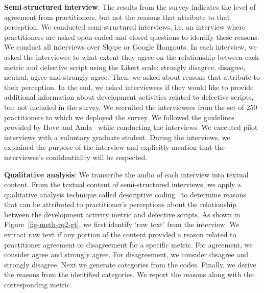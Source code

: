 \documentclass[smallextended]{svjour3}       %
\begin{document}
\textbf{Semi-structured interview}: The results from the survey indicates the level of agreement from practitioners, but not the reasons that attribute to that perception. We conducted semi-structured interviews, i.e. an interview where practitioners are asked open-ended and closed questions to identify these reasons. We conduct all interviews over Skype or Google Hangouts. In each interview, we asked the interviewee to what extent they agree on the relationship between each metric and defective script using the Likert scale: strongly disagree, disagree, neutral, agree and strongly agree. Then, we asked about reasons that attribute to their perception. In the end, we asked interviewees if they would like to provide additional information about development activities related to defective scripts, but not included in the survey. We recruited the interviewees from the set of 250 practitioners to which we deployed the survey. We followed the guidelines provided by Hove and Anda~\citep{hove:anda:semi:interview} while conducting the interviews. We executed pilot interviews with a voluntary graduate student. During the interviews, we explained the purpose of the interview and explicitly mention that the interviewee's confidentiality will be respected.  


\textbf{Qualitative analysis}: We transcribe the audio of each interview into textual content. From the textual content of semi-structured interviews, we apply a qualitative analysis technique called descriptive coding~\citep{saldana2015coding} to determine reasons that can be attributed to practitioner's perceptions about the relationship between the development activity metric and defective scripts. As shown in Figure~\ref{fig-meth-rq2-gt}, we first identify `raw text' from the interview. We extract raw text if any portion of the content provided a reason related to practitioner agreement or disagreement for a specific metric. For agreement, we consider agree and strongly agree. For disagreement, we consider disagree and strongly disagree. Next we generate categories from the codes. Finally, we derive the reasons from the identified categories. We report the reasons along with the corresponding metric.

\end{document}
